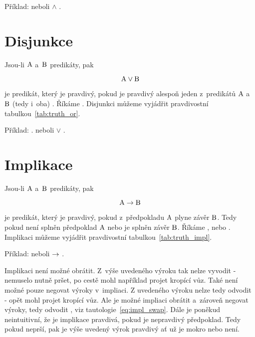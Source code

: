 
Příklad:  neboli  \(\land\) .

\section{Disjunkce}

Jsou-li \(\mathrm{A}\) a~\(\mathrm{B}\) predikáty, pak

\begin{equation}
\mathrm{A} \lor \mathrm{B}
\end{equation}

je predikát, který je pravdivý, pokud je pravdivý alespoň jeden z~predikátů \(\mathrm{A}\) a~\(\mathrm{B}\) (tedy i~oba) . Říkáme .
Disjunkci můžeme vyjádřit pravdivostní tabulkou~\ref{tab:truth_or}.


Příklad: . neboli  \(\lor\) .

\section{Implikace}

Jsou-li \(\mathrm{A}\) a~\(\mathrm{B}\) predikáty, pak

\begin{equation}
\mathrm{A} \rightarrow \mathrm{B}
\end{equation}

je predikát, který je pravdivý, pokud z~předpokladu \(\mathrm{A}\) plyne závěr \(\mathrm{B}\). Tedy pokud není splněn předpoklad \(\mathrm{A}\) nebo je splněn závěr \(\mathrm{B}\). Říkáme ,  nebo .
Implikaci můžeme vyjádřit pravdivostní tabulkou~\ref{tab:truth_impl}.


Příklad:  neboli  \(\rightarrow\) .

Implikaci není možné obrátit. Z~výše uvedeného výroku tak nelze vyvodit  - nemuselo nutně pršet, po cestě mohl například projet kropící vůz. Také není možné pouze negovat výroky v~impliaci. Z uvedeného výroku nelze tedy odvodit  - opět mohl projet kropící vůz. Ale je možné impliaci obrátit a~zároveň negovat výroky, tedy odvodit , viz tautologie~\eqref{eq:impl_swap}. Dále je poněkud neintuitivní, že je implikace pravdivá, pokud je nepravdivý předpoklad. Tedy pokud neprší, pak je výše uvedený výrok pravdivý ať už je mokro nebo není. 

